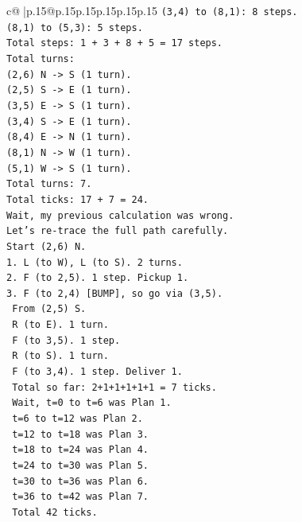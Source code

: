\documentclass{article}
\begin{document}
{\begin{supertabular}{c@{$\;$}|p{.15\linewidth}@{}p{.15\linewidth}p{.15\linewidth}p{.15\linewidth}p{.15\linewidth}p{.15\linewidth}}
{{{\texttt{(3,4) to (8,1): 8 steps.} \\
\texttt{(8,1) to (5,3): 5 steps.} \\
\texttt{Total steps: 1 + 3 + 8 + 5 = 17 steps.} \\
\texttt{Total turns:} \\
\texttt{(2,6) N {-}> S (1 turn).} \\
\texttt{(2,5) S {-}> E (1 turn).} \\
\texttt{(3,5) E {-}> S (1 turn).} \\
\texttt{(3,4) S {-}> E (1 turn).} \\
\texttt{(8,4) E {-}> N (1 turn).} \\
\texttt{(8,1) N {-}> W (1 turn).} \\
\texttt{(5,1) W {-}> S (1 turn).} \\
\texttt{Total turns: 7.} \\
\texttt{Total ticks: 17 + 7 = 24.} \\
\texttt{Wait, my previous calculation was wrong.} \\
\texttt{Let's re{-}trace the full path carefully.} \\
\texttt{Start (2,6) N.} \\
\texttt{1. L (to W), L (to S). 2 turns.} \\
\texttt{2. F (to 2,5). 1 step. Pickup 1.} \\
\texttt{3. F (to 2,4) {[}BUMP{]}, so go via (3,5).} \\
\texttt{   From (2,5) S.} \\
\texttt{   R (to E). 1 turn.} \\
\texttt{   F (to 3,5). 1 step.} \\
\texttt{   R (to S). 1 turn.} \\
\texttt{   F (to 3,4). 1 step. Deliver 1.} \\
\texttt{   Total so far: 2+1+1+1+1+1 = 7 ticks.} \\
\texttt{   Wait, t=0 to t=6 was Plan 1.} \\
\texttt{   t=6 to t=12 was Plan 2.} \\
\texttt{   t=12 to t=18 was Plan 3.} \\
\texttt{   t=18 to t=24 was Plan 4.} \\
\texttt{   t=24 to t=30 was Plan 5.} \\
\texttt{   t=30 to t=36 was Plan 6.} \\
\texttt{   t=36 to t=42 was Plan 7.} \\
\texttt{   Total 42 ticks.} \\
}}}
\end{supertabular}}
\end{document}
